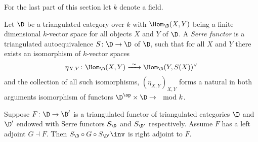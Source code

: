 For the last part of this section let $k$ denote a field.

\begin{definition}
    Let $\D$ be a triangulated category over $k$ with $\Hom_\D(X, Y)$ being a finite dimensional $k$-vector space for all objects $X$ and $Y$ of $\D$. A \emph{Serre functor} is a triangulated autoequivalence $S \colon \D \to \D$ of $\D$, such that for all $X$ and $Y$ there exists an isomorphism of $k$-vector spaces
    \[
        \eta_{X,Y} \colon \Hom_\D(X, Y) \xrightarrow{ \ \sim \ } \Hom_\D(Y, S(X))^\vee
    \]
    and the collection of all such isomorphisms, $(\eta_{X,Y})_{X,Y}$ forms a natural in both arguments isomorphism of functors $\D^\op \times \D \to \mod{k}$.
\end{definition}

\begin{proposition}
    Suppose $F \colon \D \to \D'$ is a triangulated functor of triangulated categories $\D$ and $\D'$ endowed with Serre functors $S_\D$ and $S_{\D'}$ respectively. Assume $F$ has a left adjoint $G \dashv F$. Then $S_\D \circ G \circ S_{\D'}\inv$ is right adjoint to $F$.
\end{proposition}